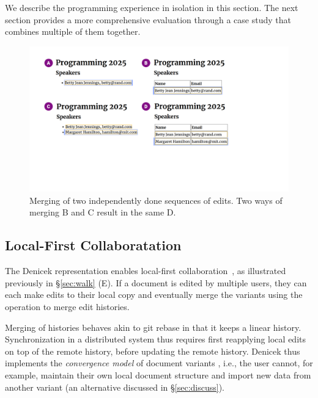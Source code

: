 \documentclass[sigconf,anonymous,screen]{acmart}
\begin{document}
We describe the programming experience in isolation in this section. The next section provides a
more comprehensive evaluation through a case study that combines multiple of them together.


\begin{figure}[t]
\includegraphics[width=0.9\columnwidth,clip,trim=1.7cm 6cm 7.8cm 1.5cm]{fig/merging.pdf}
\caption{Merging of two independently done sequences of edits. Two ways of merging B and C result in the same D.}
\label{fig:merging}
\end{figure}


\subsection{Local-First Collaboratation}
\label{sec:impl-collab}

The Denicek representation enables local-first collaboration~\cite{kleppmann-2019-local},
as illustrated previously in \S\ref{sec:walk} (E). If a document is edited by multiple users, they can
each make edits to their local copy and eventually merge the variants using the operation to
merge edit histories.

Merging of histories behaves akin to git rebase in that it keeps a linear history. Synchronization
in a distributed system thus requires first reapplying local edits on top of the remote history,
before updating the remote history. Denicek thus implements the \emph{convergence model} of
document variants \cite{edwards-2025-schema}, i.e., the user cannot, for example, maintain their
own local document structure and import new data from another variant (an alternative discussed
in \S\ref{sec:discuss}).
\end{document}
